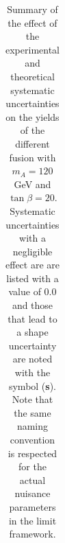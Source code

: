 \begin{table}[hp]
\begin{tabular}{lccccc}
    \hline
    \hline
  \end{tabular}
  \caption{Summary of the effect of the experimental and theoretical systematic uncertainties on the yields of the different
	fusion with $m_{A}=120$ GeV and $\tan\beta=20$. 
	 Systematic uncertainties with a negligible effect are are listed with a value of 0.0
	 and those that lead to a  shape uncertainty are noted with the symbol (\textbf{s}). 
	Note that the same naming convention is respected for the actual nuisance parameters in the limit framework.}

  \label{tab:ExpSys:btag}
\end{table}



